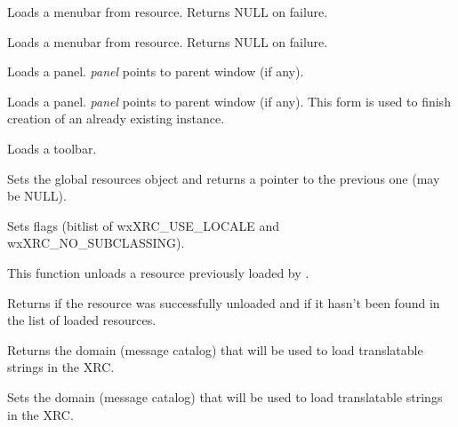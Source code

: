 
Loads a menubar from resource. Returns NULL on failure.


Loads a menubar from resource. Returns NULL on failure.


\label{wxxmlresourceloadpanel}


Loads a panel. {\it panel} points to parent window (if any).


Loads a panel. {\it panel} points to parent window (if any). This form
is used to finish creation of an already existing instance.


\label{wxxmlresourceloadtoolbar}


Loads a toolbar.


\label{wxxmlresourceset}


Sets the global resources object and returns a pointer to the previous one (may be NULL).


\label{wxxmlresourcesetflags}


Sets flags (bitlist of wxXRC\_USE\_LOCALE and wxXRC\_NO\_SUBCLASSING).


\label{wxxmlresourceunload}


This function unloads a resource previously loaded by 
.

Returns \true if the resource was successfully unloaded and \false if it hasn't
been found in the list of loaded resources.



\label{wxxmlresourcegetdomain}


Returns the domain (message catalog) that will be used to load
translatable strings in the XRC.


\label{wxxmlresourcesetdomain}


Sets the domain (message catalog) that will be used to load
translatable strings in the XRC.

